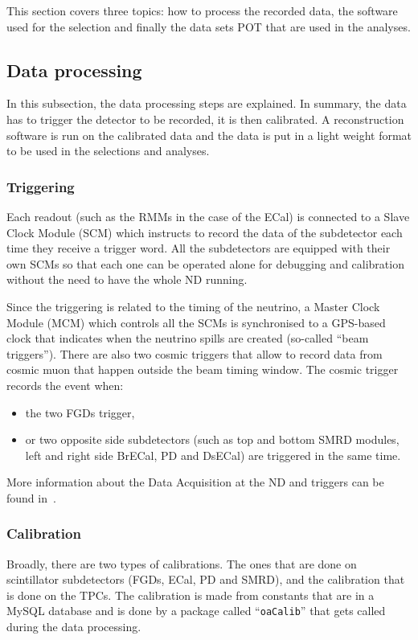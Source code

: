 
This section covers three topics: how to process the recorded data,
the software used for the selection and finally the data sets
\Gls{POT} that are used in the analyses.

\subsection{Data processing}
\label{subsec:dataprocessing}
In this subsection, the data processing steps are explained. In
summary, the data has to trigger the detector to be recorded, it is
then calibrated. A reconstruction software is run on the calibrated
data and the data is put in a light weight format to be used in the
selections and analyses.

\subsubsection{Triggering}
\label{subsubsec:triggers}
Each readout (such as the \Glspl{RMM} in the case of the \Gls{ECal})
is connected to a Slave Clock Module (\Gls{SCM}) which instructs to
record the data of the subdetector each time they receive a trigger
word. All the subdetectors are equipped with their own \Glspl{SCM} so
that each one can be operated alone for debugging and calibration
without the need to have the whole \Gls{ND} running.

Since the triggering is related to the timing of the neutrino, a
Master Clock Module (\Gls{MCM}) which controls all the \Glspl{SCM} is
synchronised to a GPS-based clock that indicates when the neutrino
spills are created (so-called ``beam triggers''). There are also two
cosmic triggers that allow to record data from cosmic muon that happen
outside the beam timing window. The cosmic trigger records the event
when:
\begin{itemize}[noitemsep,topsep=0pt]
\item the two \Glspl{FGD} trigger,
\item or two opposite side subdetectors (such as top and bottom
  \Gls{SMRD} modules, left and right side \Gls{BrECal}, \Gls{PD} and
  \Gls{DsECal}) are triggered in the same time.
\end{itemize}
More information about the Data Acquisition at the \Gls{ND} and
triggers can be found in~\cite{T2K2011}.

\subsubsection{Calibration}
\label{subsubsec:calibration}
Broadly, there are two types of calibrations. The ones that are done
on scintillator subdetectors (\Glspl{FGD}, \Gls{ECal}, \Gls{PD} and
\Gls{SMRD}), and the calibration that is done on the \Glspl{TPC}. The
calibration is made from constants that are in a MySQL database and is
done by a package called ``\texttt{oaCalib}'' that gets called during
the data processing.

